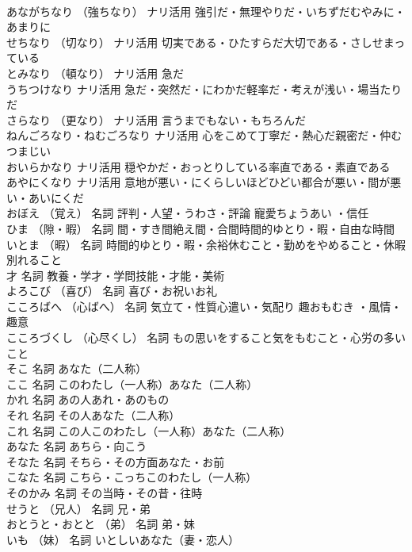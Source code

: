 \documentclass[8pt]{extreport}
\begin{document}
\begin{CJK}{UTF8}{min}
\\	あながちなり	（強ちなり）	ナリ活用	強引だ・無理やりだ・いちずだむやみに・あまりに
\\	せちなり	（切なり）	ナリ活用	切実である・ひたすらだ大切である・さしせまっている
\\	とみなり	（頓なり）	ナリ活用	急だ
\\	うちつけなり		ナリ活用	急だ・突然だ・にわかだ軽率だ・考えが浅い・場当たりだ
\\	さらなり	（更なり）	ナリ活用	言うまでもない・もちろんだ
\\	ねんごろなり・ねむごろなり		ナリ活用	心をこめて丁寧だ・熱心だ親密だ・仲むつまじい
\\	おいらかなり		ナリ活用	穏やかだ・おっとりしている率直である・素直である
\\	あやにくなり		ナリ活用	意地が悪い・にくらしいほどひどい都合が悪い・間が悪い・あいにくだ
\\	おぼえ	（覚え）	名詞	評判・人望・うわさ・評論 寵愛ちょうあい ・信任
\\	ひま	（隙・暇）	名詞	間・すき間絶え間・合間時間的ゆとり・暇・自由な時間
\\	いとま	（暇）	名詞	時間的ゆとり・暇・余裕休むこと・勤めをやめること・休暇別れること
\\	才		名詞	教養・学才・学問技能・才能・美術
\\	よろこび	（喜び）	名詞	喜び・お祝いお礼
\\	こころばへ	（心ばへ）	名詞	気立て・性質心遣い・気配り 趣おもむき ・風情・趣意
\\	こころづくし	（心尽くし）	名詞	もの思いをすること気をもむこと・心労の多いこと
\\	そこ		名詞	あなた（二人称）
\\	ここ		名詞	このわたし（一人称）あなた（二人称）
\\	かれ		名詞	あの人あれ・あのもの
\\	それ		名詞	その人あなた（二人称）
\\	これ		名詞	この人このわたし（一人称）あなた（二人称）
\\	あなた		名詞	あちら・向こう
\\	そなた		名詞	そちら・その方面あなた・お前
\\	こなた		名詞	こちら・こっちこのわたし（一人称）
\\	そのかみ		名詞	その当時・その昔・往時
\\	せうと	（兄人）	名詞	兄・弟
\\	おとうと・おとと	（弟）	名詞	弟・妹
\\	いも	（妹）	名詞	いとしいあなた（妻・恋人）

\end{CJK}
\end{document}
